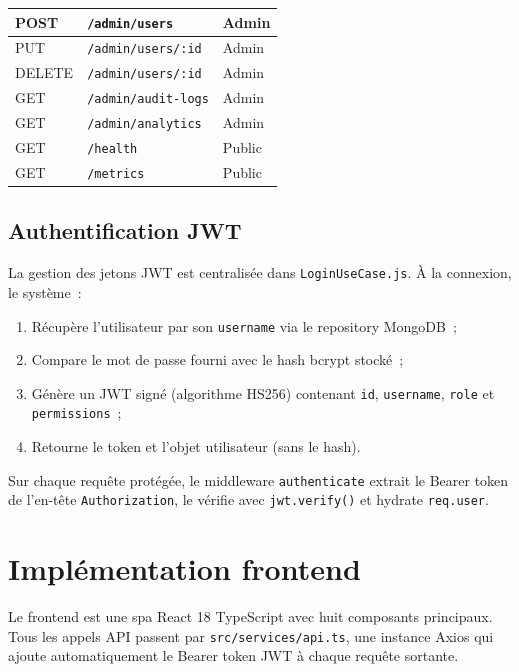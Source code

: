 \begin{longtable}{|L{2cm}|L{8cm}|L{3.5cm}|}
  POST   & \texttt{/admin/users}            & Admin       \\ \hline
  PUT    & \texttt{/admin/users/:id}        & Admin       \\ \hline
  DELETE & \texttt{/admin/users/:id}        & Admin       \\ \hline
  GET    & \texttt{/admin/audit-logs}       & Admin       \\ \hline
  GET    & \texttt{/admin/analytics}        & Admin       \\ \hline
  GET    & \texttt{/health}                 & Public      \\ \hline
  GET    & \texttt{/metrics}                & Public      \\
\end{longtable}

\subsection{Authentification JWT}

La gestion des jetons JWT est centralisée dans \texttt{LoginUseCase.js}.
À la connexion, le système~:
\begin{enumerate}
  \item Récupère l'utilisateur par son \texttt{username} via le
        repository MongoDB~;
  \item Compare le mot de passe fourni avec le hash bcrypt stocké~;
  \item Génère un JWT signé (algorithme HS256) contenant \texttt{id},
        \texttt{username}, \texttt{role} et \texttt{permissions}~;
  \item Retourne le token et l'objet utilisateur (sans le hash).
\end{enumerate}

Sur chaque requête protégée, le middleware \texttt{authenticate}
extrait le Bearer token de l'en-tête \texttt{Authorization}, le
vérifie avec \texttt{jwt.verify()} et hydrate \texttt{req.user}.


\section{Implémentation frontend}

Le frontend est une \gls{spa} React 18 TypeScript avec huit composants
principaux. Tous les appels API passent par \texttt{src/services/api.ts},
une instance Axios qui ajoute automatiquement le Bearer token JWT à
chaque requête sortante.


